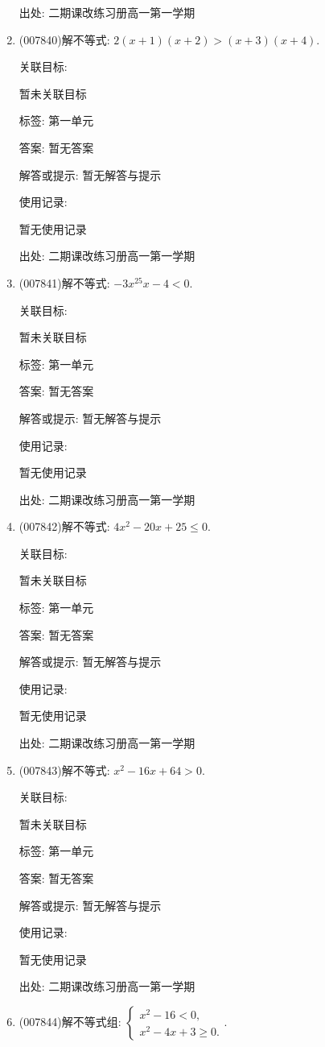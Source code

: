 \documentclass[10pt,a4paper]{article}
\begin{document}
\begin{enumerate}[1.]
出处: 二期课改练习册高一第一学期
\item { (007840)}解不等式: $2(x+1)(x+2)>(x+3)(x+4)$.


关联目标:

暂未关联目标



标签: 第一单元

答案: 暂无答案

解答或提示: 暂无解答与提示

使用记录:

暂无使用记录


出处: 二期课改练习册高一第一学期
\item { (007841)}解不等式: $-3x^25x-4<0$.


关联目标:

暂未关联目标



标签: 第一单元

答案: 暂无答案

解答或提示: 暂无解答与提示

使用记录:

暂无使用记录


出处: 二期课改练习册高一第一学期
\item { (007842)}解不等式: $4x^2-20x+25\le 0$.


关联目标:

暂未关联目标



标签: 第一单元

答案: 暂无答案

解答或提示: 暂无解答与提示

使用记录:

暂无使用记录


出处: 二期课改练习册高一第一学期
\item { (007843)}解不等式: $x^2-16x+64>0$.


关联目标:

暂未关联目标



标签: 第一单元

答案: 暂无答案

解答或提示: 暂无解答与提示

使用记录:

暂无使用记录


出处: 二期课改练习册高一第一学期
\item { (007844)}解不等式组: $\begin{cases} x^2-16<0, \\ x^2-4x+3\ge 0. \end{cases}$.



\end{enumerate}
\end{document}
